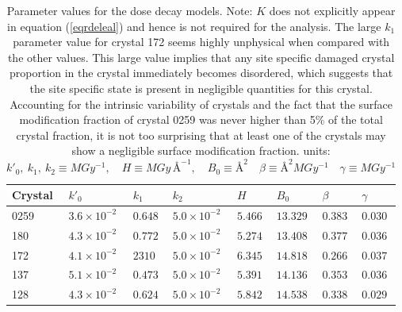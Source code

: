 \begin{table}[H]
\small
\captionsetup{justification=centering}
	\caption[Parameter values for the dose decay models.]{Parameter values for the dose decay models.
	Note: $K$ does not explicitly appear in equation (\ref{eqrdeleal}) and hence is not required for the analysis.
	The large $k_1$ parameter value for crystal 172 seems highly unphysical when compared with the other values.
	This large value implies that any site specific damaged crystal proportion in the crystal immediately becomes disordered, which suggests that the site specific state is present in negligible quantities for this crystal.
    Accounting for the intrinsic variability of crystals and the fact that the surface modification fraction of crystal 0259 was never higher than 5\% of the total crystal fraction, it is not too surprising that at least one of the crystals may show a negligible surface modification fraction.
	\newline
	units: $k'_0,\ k_1,\ k_2 \equiv MGy^{-1}, \quad H \equiv MGy\,\text{\AA}^{-1}, \quad B_0 \equiv \text{\AA}^2 \quad \beta \equiv \text{\AA}^2 MGy^{-1} \quad \gamma \equiv MGy^{-1}$}
	\centering
	\begin{tabular}{p{1.6cm} p{1.6cm} p{1.6cm} p{1.6cm} p{1.2cm} p{1.2cm} p{1.2cm} p{1.2cm}}
		\hline
		Crystal	&$k'_0$	& $k_1$	&$k_2$ &$H$	 &$B_0$	&$\beta$	&$\gamma$	\\
		\hline
		0259     &$3.6 \times 10^{-2}$   &$0.648$   	&$5.0 \times 10^{-2}$   &$5.466$    &$13.329$    &$0.383$  &$0.030$ \\
	  180      &$4.3 \times 10^{-2}$   &$0.772$   	&$5.0 \times 10^{-2}$   &$5.274$    &$13.408$    &$0.377$  &$0.036$ \\
		172      &$4.1 \times 10^{-2}$   &$2310$  &$5.0 \times 10^{-2}$   &$6.345$    &$14.818$    &$0.266$  &$0.037$ \\
	  137      &$5.1 \times 10^{-2}$   &$0.473$   	&$5.0 \times 10^{-2}$   &$5.391$    &$14.136$    &$0.353$  &$0.036$ \\
		128      &$4.3 \times 10^{-2}$   &$0.624$   	&$5.0 \times 10^{-2}$   &$5.842$    &$14.538$    &$0.338$  &$0.029$ \\
		\hline
	\end{tabular}
	\label{tab:RDE params1}
\end{table}

